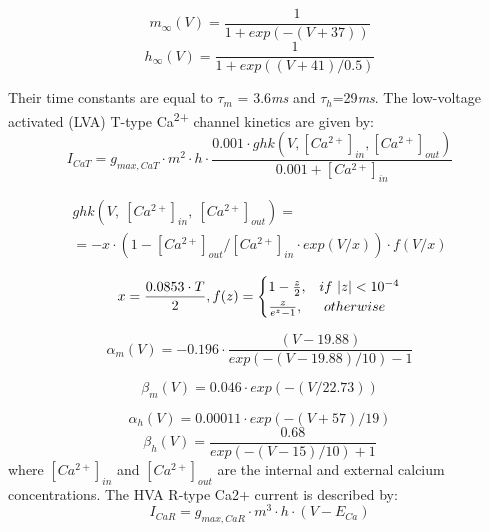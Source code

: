 \documentclass[a4paper,12pt]{article}
\begin{document}
\begin{equation}
m_{\infty}(V)=\frac {1}{1+exp(-(V+37))}
\end{equation}
\begin{equation}
h_{\infty}(V)=\frac {1}{1+exp( (V+41)/0.5)}
\end{equation}

Their time constants are equal to $\tau_m$ = 3.6\textit{ms} and $\tau_h$=29\textit{ms}. The low-voltage activated (LVA) T-type Ca\textsuperscript{2+} channel kinetics are given by:
\begin{equation}
I_{CaT} = g_{max, CaT}\cdot m^2\cdot h \cdot \frac{0.001 \cdot ghk(V,[Ca^{2+}]_{in},[Ca^{2+}]_{out})}{0.001+[Ca^{2+}]_{in} }
\end{equation}

\begin{eqnarray}
ghk(V,\ [Ca^{2+}]_{in},\ [Ca^{2+}]_{out}) = \nonumber \\
= -x\cdot (1 - [Ca^{2+}]_{out}/[Ca^{2+}]_{in} \cdot exp(V/x)) \cdot f(V/x)
\end{eqnarray}

\begin{equation}
x=\frac{0.0853\cdot T}{2}, \\
f(z) = \begin{cases} 1-\frac {z}{2}, & if \ |z|<10^{-4} \\ \frac z{e^z-1}, & \  otherwise \ \end{cases}
\end{equation}

\begin{equation}
\alpha_m(V)=-0.196\cdot \frac{(V-19.88)}{exp(-(V-19.88)/10)-1} 
\end{equation}

\begin{equation}
\beta_m(V) = 0.046\cdot exp(-(V/22.73))
\end{equation}

\begin{equation}
\alpha_h(V)= 0.00011\cdot exp(-(V+57)/19)
\end{equation}
\begin{equation}
\beta_h(V)=\frac {0.68}{exp(-(V-15)/10)+1}
\end{equation}
where $[Ca^{2+}]_{in}$ and $[Ca^{2+}]_{out}$ are the internal and external calcium concentrations. The HVA R-type Ca2+ current is described by:
\begin{equation}
I_{CaR} = g_{max, CaR}\cdot m^3\cdot h\cdot (V-E_{Ca})
\end{equation}
\end{document}

